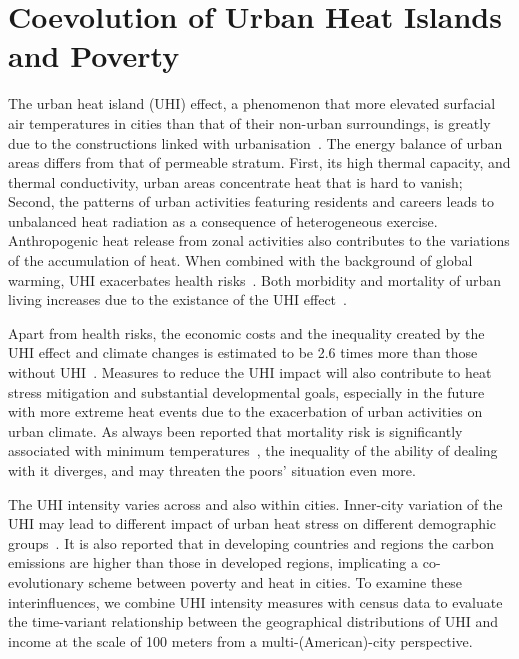 \chapter{Coevolution of Urban Heat Islands and Poverty}

The urban heat island (UHI) effect, a phenomenon that more elevated surfacial air temperatures in cities than that of their non-urban surroundings, is greatly due to the constructions linked with urbanisation~\cite{Yunfei2020On,Chapman2017The,zhao2014strong,Peng2012Surface}. The energy balance of urban areas differs from that of permeable stratum. First, its high thermal capacity, and thermal conductivity, urban areas concentrate heat that is hard to vanish; Second, the patterns of urban activities featuring residents and careers leads to unbalanced heat radiation as a consequence of heterogeneous exercise. Anthropogenic heat release from zonal activities also contributes to the variations of the accumulation of heat. When combined with the background of global warming, UHI exacerbates health risks~\cite{milan2015reducing}. Both morbidity and mortality of urban living increases due to the existance of the UHI effect~\cite{tan2010the,stone2015}.

Apart from health risks, the economic costs and the inequality created by the UHI effect and climate changes is estimated to be 2.6 times more than those without UHI~\cite{estrada2017a}. Measures to reduce the UHI impact will also contribute to heat stress mitigation and substantial developmental goals, especially in the future with more extreme heat events due to the exacerbation of urban activities on urban climate. As always been reported that mortality risk is significantly associated with minimum temperatures~\cite{kalkstein1989weather}, the inequality of the ability of dealing with it diverges, and may threaten the poors' situation even more.

The UHI intensity varies across and also within cities. Inner-city variation of the UHI may lead to different impact of urban heat stress on different demographic groups~\cite{chakraborty2019disproportionately}. It is also reported that in developing countries and regions the carbon emissions are higher than those in developed regions, implicating a co-evolutionary scheme between poverty and heat in cities. To examine these interinfluences, we combine UHI intensity measures with census data to evaluate the time-variant relationship between the geographical distributions of UHI and income at the scale of 100 meters from a multi-(American)-city perspective.

